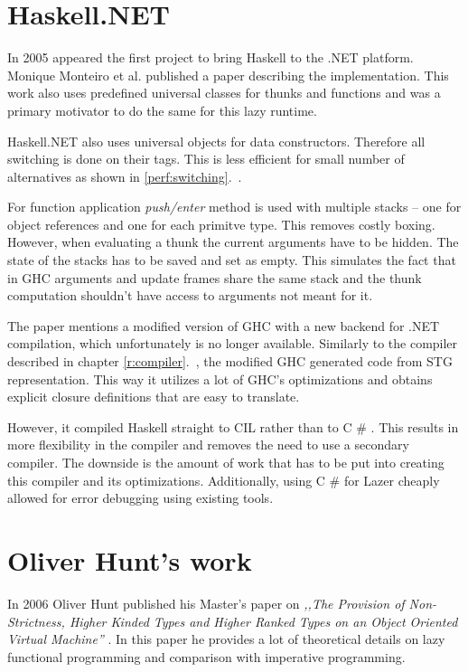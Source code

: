 \documentclass[en]{pracamgr}
\newcommand{\shrp}{%
  {\fontfamily{ppl}\selectfont\#%
  }}
\newcommand{\myref}[1]{\ref{#1}.~\textit{\nameref{#1}}}
\begin{document}
\section{Haskell.NET}\label{s:HSNet}

In 2005 appeared the first project to bring Haskell
to the .NET platform.
Monique Monteiro et al. published a paper \cite{Brazil}
describing the implementation. This work also
uses predefined universal classes for thunks and functions and was
a primary motivator to do the same for this lazy runtime.

Haskell.NET also uses universal objects for data constructors.
Therefore all switching is done on their tags. This
is less efficient for small number of alternatives as shown
in \myref{perf:switching}.

For function application \textit{push/enter} method is used
with multiple stacks -- one for object references and
one for each primitve type. This removes costly boxing.
However, when evaluating a thunk
the current arguments have to be hidden.
The state of the stacks has to be saved and set as empty.
This simulates the fact that in GHC arguments and update frames share
the same stack and the thunk computation shouldn't have access to arguments
not meant for it.

The paper mentions a modified version of GHC
with a new backend for .NET compilation, which
unfortunately is no longer available.
Similarly to the compiler described in chapter \myref{r:compiler},
the modified GHC generated code from STG representation.
This way it utilizes a lot of GHC's optimizations and obtains
explicit closure definitions that are easy to translate.

However, it compiled Haskell straight to CIL rather than to C\shrp{}.
This results in more flexibility in the compiler and removes the
need to use a secondary compiler.
The downside is the amount of work that has to be put into
creating this compiler and its optimizations.
Additionally, using C\shrp{} for Lazer cheaply allowed for error debugging
using existing tools.

\section{Oliver Hunt's work}\label{s:Hunt}

In 2006 Oliver Hunt published his Master's paper
on \textit{,,The Provision of Non-Strictness, Higher Kinded Types
and Higher Ranked Types on an Object Oriented
Virtual Machine''} \cite{Hunt}.
In this paper he provides a lot of theoretical details
on lazy functional programming and comparison with imperative programming.
\end{document}
